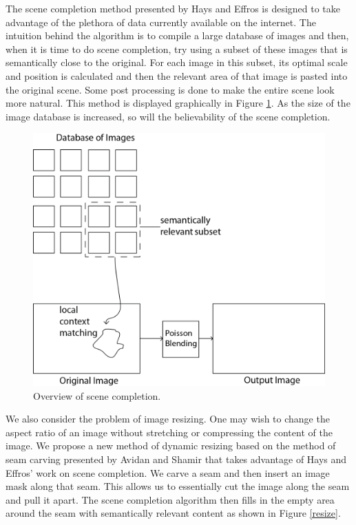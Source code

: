 \documentclass[11pt]{amsart}
\begin{document}
The scene completion method presented by Hays and Effros is designed to take advantage of the plethora of data currently available on the internet. The intuition behind the algorithm is to compile a large database of images and then, when it is time to do scene completion, try using a subset of these images that is semantically close to the original. For each image in this subset, its optimal scale and position is calculated and then the relevant area of that image is pasted into the original scene. Some post processing is done to make the entire scene look more natural. This method is displayed graphically in Figure \ref{scene}. As the size of the image database is increased, so will the believability of the scene completion.

\begin{figure}[htbp]
\begin{center}
\includegraphics[scale=.5]{projectOverview.png}
\caption{Overview of scene completion.}
\label{scene}
\end{center}
\end{figure}

We also consider the problem of image resizing. One may wish to change the aspect ratio of an image without stretching or compressing the content of the image. We propose a new method of dynamic resizing based on the method of seam carving presented by Avidan and Shamir \cite{Avidan:2007} that takes advantage of Hays and Effros' work on scene completion. We carve a seam and then insert an image mask along that seam. This allows us to essentially cut the image along the seam and pull it apart. The scene completion algorithm then fills in the empty area around the seam with semantically relevant content as shown in Figure \ref{resize}. 
\end{document}

